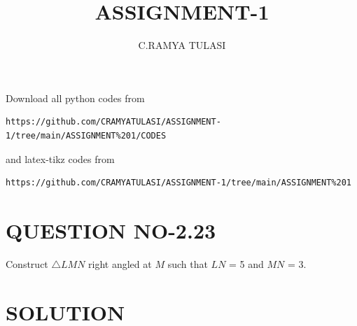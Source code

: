 \documentclass[journal,12pt,twocolumn]{IEEEtran}
\begin{document}
\renewcommand{\thefigure}{\theproblem}

\def\putbox#1#2#3{\makebox[0in][l]{\makebox[#1][l]{}\raisebox{\baselineskip}[0in][0in]{\raisebox{#2}[0in][0in]{#3}}}}
     \def\rightbox#1{\makebox[0in][r]{#1}}
     \def\centbox#1{\makebox[0in]{#1}}
     \def\topbox#1{\raisebox{-\baselineskip}[0in][0in]{#1}}
     \def\midbox#1{\raisebox{-0.5\baselineskip}[0in][0in]{#1}}
\vspace{3cm}
\title{ASSIGNMENT-1}
\author{C.RAMYA TULASI}

\maketitle
\newpage

\bigskip
\renewcommand{\thefigure}{\theenumi}
\renewcommand{\thetable}{\theenumi}
Download all python codes from 
\begin{lstlisting}
https://github.com/CRAMYATULASI/ASSIGNMENT-1/tree/main/ASSIGNMENT%201/CODES
\end{lstlisting}
%
and latex-tikz codes from 
%
\begin{lstlisting}
https://github.com/CRAMYATULASI/ASSIGNMENT-1/tree/main/ASSIGNMENT%201
\end{lstlisting}
%
\section{QUESTION NO-2.23}
\item Construct $\triangle LMN$  right angled at $M$ such that
$LN$ = 5 and $MN$ = 3.
%

%
\section{SOLUTION}
 
\end{document}
